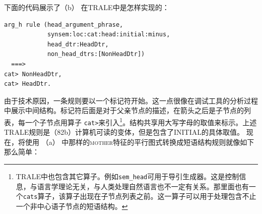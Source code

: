 下面的代码展示了（b） 在TRALE中是怎样实现的：
\begin{verbatim}
arg_h rule (head_argument_phrase,
            synsem:loc:cat:head:initial:minus,
            head_dtr:HeadDtr,
            non_head_dtrs:[NonHeadDtr])
  ===>
cat> NonHeadDtr,
cat> HeadDtr.
\end{verbatim}
由于技术原因，一条规则要以一个标记符开始。这一点很像在调试工具的分析过程中展示中间结构。标记符后面是对于父亲节点的描述，在箭头之后是子节点的列表，每一个子节点用算子 \verb+cat>+来引入\footnote{%
  TRALE中也包含其它算子。例如\texttt{sem\_head}可用于导引生成器。这是控制信息，与语言学理论无关，与人类处理自然语言也不一定有关系。那里面也有一个\texttt{cats}算子，该算子出现在子节点列表之前。这一算子可以用于处理包含不止一个非中心语子节点的短语结构。%
}。结构共享用大写字母的取值来标示。上述TRALE规则是（82b）计算机可读的变体，但是包含了INITIAL的具体取值。
现在，将使用 （a） 中那样的\textsc{mother}特征的平行图式转换成短语结构规则就像如下那么简单：
\eal
\ex {}

